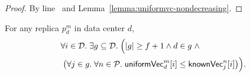 \begin{proof} \label{proof:snapshotvc-uniformvc}
  By line~\code{\ref{alg:unistore-coord}}{\ref{line:start-snapvc}}
  and Lemma~\ref{lemma:uniformvc-nondecreasing}.
\end{proof}

\begin{applemma}[\prop{3}] \label{lemma:uniformvc-knownvc-f+1}
  For any replica $p^{m}_{d}$ in data center $d$,
  \begin{align*}
    &\forall i \in \mathcal{D}.\; \exists g \subseteq \mathcal{D}.\; \Big(
       |g| \ge f + 1 \land d \in g\; \land \\
      &\; \big(\forall j \in g.\; \forall n \in \mathcal{P}.\;
        {\sf uniformVec}^{m}_{d}[i] \le {\sf knownVec}^{n}_{j}[i] \big)\Big).
  \end{align*}
\end{applemma}

